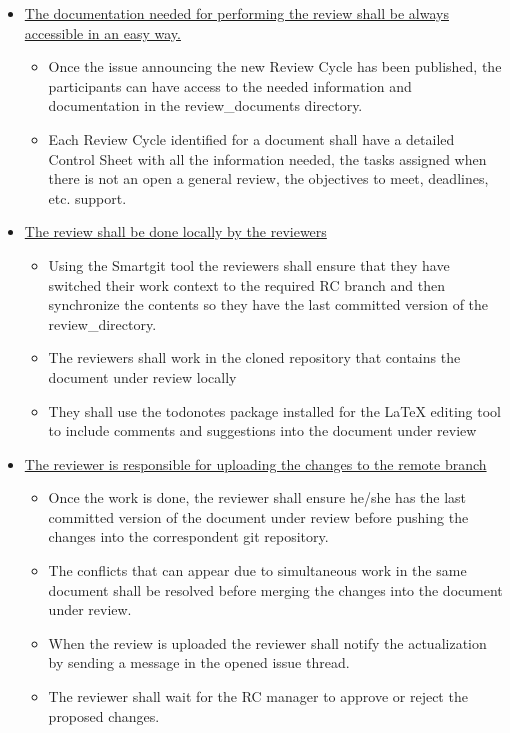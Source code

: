 \documentclass{template/openetcs_article}
\begin{document}
\begin{itemize}
\item \underline{The documentation needed for performing the review shall be always accessible in an easy way.}

\begin{itemize}
\item Once the issue announcing the new Review Cycle has been published, the participants can have access to the needed information and documentation in the review\_documents directory.
\item Each Review Cycle identified for a document shall have a detailed Control Sheet with all the information needed, the tasks assigned when there is not an open a general review, the objectives to meet, deadlines, etc. support.
\end{itemize}

\item \underline{The review shall be done locally by the reviewers}
\begin{itemize}
\item Using the Smartgit tool the reviewers shall ensure that they have switched their work context to the required RC branch and then synchronize the contents so they have the last committed version of the review\_directory.
\item The reviewers shall work in the cloned repository that contains the document under review locally 
\item They shall use the todonotes package installed for the LaTeX editing tool to include comments and suggestions into the document under review
\end{itemize}

\item \underline{The reviewer is responsible for uploading the changes to the remote branch}
\begin{itemize}
\item Once the work is done, the reviewer shall ensure he/she has the last committed version of the document under review before pushing the changes into the correspondent git repository. 
\item The conflicts that can appear due to simultaneous work in the same document shall be resolved before merging the changes into the document under review. 
\item When the review is uploaded the reviewer shall notify the actualization by sending a message in the opened issue thread.
\item The reviewer shall wait for the RC manager to approve or reject the proposed changes.
\end{itemize}


\end{itemize}
\end{document}
